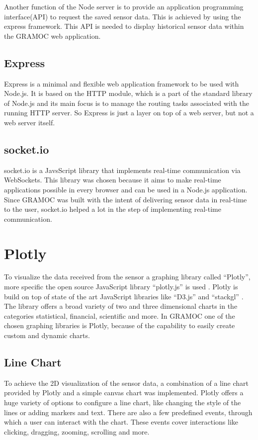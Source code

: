 Another function of the Node server is to provide an application programming interface(API) to request the saved sensor data. This is achieved by using the express framework. This API is needed to display historical sensor data within the GRAMOC web application.

\subsection{Express}
Express is a minimal and flexible web application framework to be used with Node.js. It is based on the HTTP module, which is a part of the standard library of Node.js and its main focus is to manage the routing tasks associated with the running HTTP server. So Express is just a layer on top of a web server, but not a web server itself.

\subsection{socket.io}
\label{subsec:socketio}
socket.io is a JavsScript library that implements real-time communication via WebSockets. This library was chosen because it aims to make real-time applications possible in every browser and can be used in a Node.js application. Since GRAMOC was built with the intent of delivering sensor data in real-time to the user, socket.io helped a lot in the step of implementing real-time communication.


\section{Plotly}
\label{sec:Plotly}
To visualize the data received from the sensor a graphing library called ``Plotly'', more specific the open source JavaScript library ``plotly.js'' is used \cite{Plotly, PlotlyJS}. Plotly is build on top of state of the art JavaScript libraries like ``D3.js''  and ``stackgl'' \cite{d3, stackgl}. The library offers a broad variety of two and three dimensional charts in the categories statistical, financial, scientific and more. In GRAMOC one of the chosen graphing libraries is Plotly, because of the capability to easily create custom and dynamic charts.

\subsection{Line Chart}
To achieve the 2D visualization of the sensor data, a combination of a line chart provided by Plotly and a simple canvas chart was implemented. Plotly offers a huge variety of options to configure a line chart, like changing the style of the lines or adding markers and text. There are also a few predefined events, through which a user can interact with the chart. These events cover interactions like clicking, dragging, zooming, scrolling and more.

